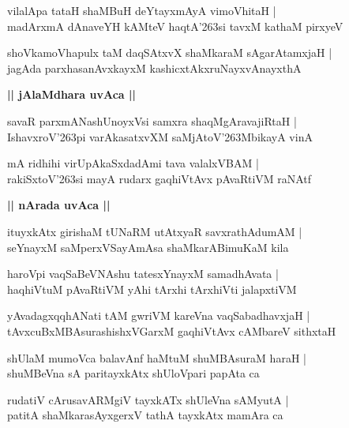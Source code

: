 \documentclass[twoside,12pt,openright]{book}
\def\S{\char'263}
\newcounter{shloka}[chapter]
\def\uvaca#1{\centerline{{\large\textbf{#1}}}}
\begin{document}
\begin{shloka}%
vilalApa tataH shaMBuH deYtayxmAyA vimoVhitaH |\\
madArxmA dAnaveYH kAMteV haqtA\S si tavxM kathaM pirxyeV
\end{shloka}

\begin{shloka}%
shoVkamoVhapulx taM daqSAtxvX shaMkaraM sAgarAtamxjaH |\\
jagAda parxhasanAvxkayxM kashicxtAkxruNayxvAnayxthA 
\end{shloka}

\uvaca{|| jAlaMdhara uvAca ||}

\begin{shloka}%
savaR parxmANashUnoyxVsi samxra shaqMgAravajiRtaH |\\
IshavxroV\S pi varAkasatxvXM saMjAtoV\S MbikayA vinA
\end{shloka}

\begin{shloka}%
mA ridhihi virUpAkaSxdadAmi tava valalxVBAM |\\
rakiSxtoV\S si mayA rudarx gaqhiVtAvx pAvaRtiVM raNAtf 
\end{shloka}

\uvaca{|| nArada uvAca ||}

\begin{shloka}%
ituyxkAtx girishaM tUNaRM utAtxyaR savxrathAdumAM |\\
seYnayxM saMperxVSayAmAsa shaMkarABimuKaM kila
\end{shloka}

\begin{shloka}%
haroVpi vaqSaBeVNAshu tatesxYnayxM samadhAvata |\\
haqhiVtuM pAvaRtiVM yAhi tArxhi tArxhiVti jalapxtiVM 
\end{shloka}

\begin{shloka}%
yAvadagxqqhANati tAM gwriVM kareVna vaqSabadhavxjaH |\\
tAvxcuBxMBAsurashishxVGarxM gaqhiVtAvx cAMbareV sithxtaH 
\end{shloka}

\begin{shloka}%
shUlaM mumoVca balavAnf haMtuM shuMBAsuraM haraH |\\
shuMBeVna sA paritayxkAtx shUloVpari papAta ca 
\end{shloka}

\begin{shloka}%
rudatiV cArusavARMgiV tayxkATx shUleVna sAMyutA |\\
patitA shaMkarasAyxgerxV tathA tayxkAtx mamAra ca 
\end{shloka}
\end{document}
